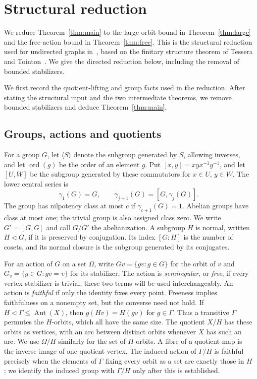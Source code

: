 \documentclass[11pt,a4paper,reqno]{amsart}
\theoremstyle{definition}
\theoremstyle{remark}
\numberwithin{equation}{section}
\DeclareMathOperator{\Aut}{Aut}
\DeclareMathOperator{\ord}{ord}
\newcommand{\gen}[1]{\langle #1\rangle}
\begin{document}
\section{Structural reduction}\label{sec:prelim}
We reduce Theorem~\ref{thm:main} to the large-orbit bound in Theorem~\ref{thm:large} and the free-action bound in Theorem~\ref{thm:free}. This is the structural reduction used for undirected graphs in~\cite[Section 7]{LiMethuku}, based on the finitary structure theorem of Tessera and Tointon~\cite{TT}. We give the directed reduction below, including the removal of bounded stabilizers.

We first record the quotient-lifting and group facts used in the reduction. After stating the structural input and the two intermediate theorems, we remove bounded stabilizers and deduce Theorem~\ref{thm:main}.

\subsection{Groups, actions and quotients}
For a group $G$, let $\gen S$ denote the subgroup generated by $S$, allowing inverses, and let $\ord(g)$ be the order of an element $g$. Put $[x,y]=xyx^{-1}y^{-1}$, and let $[U,W]$ be the subgroup generated by these commutators for $x\in U$, $y\in W$. The lower central series is
\[
 \gamma_1(G)=G,\qquad \gamma_{j+1}(G)=[G,\gamma_j(G)].
\]
The group has nilpotency class at most $c$ if $\gamma_{c+1}(G)=1$. Abelian groups have class at most one; the trivial group is also assigned class zero. We write $G'=[G,G]$ and call $G/G'$ the abelianization. A subgroup $H$ is normal, written $H\lhd G$, if it is preserved by conjugation. Its index $[G:H]$ is the number of cosets, and its normal closure is the subgroup generated by its conjugates.

For an action of $G$ on a set $\Omega$, write $Gv=\{gv:g\in G\}$ for the orbit of $v$ and $G_v=\{g\in G:gv=v\}$ for its stabilizer. The action is \emph{semiregular}, or \emph{free}, if every vertex stabilizer is trivial; these two terms will be used interchangeably. An action is \emph{faithful} if only the identity fixes every point. Freeness implies faithfulness on a nonempty set, but the converse need not hold. If $H\lhd\Gamma\le\Aut(X)$, then $g(Hv)=H(gv)$ for $g\in\Gamma$. Thus a transitive $\Gamma$ permutes the $H$-orbits, which all have the same size. The quotient $X/H$ has these orbits as vertices, with an arc between distinct orbits whenever $X$ has such an arc. We use $\Omega/H$ similarly for the set of $H$-orbits. A fibre of a quotient map is the inverse image of one quotient vertex. The induced action of $\Gamma/H$ is faithful precisely when the elements of $\Gamma$ fixing every orbit as a set are exactly those in $H$; we identify the induced group with $\Gamma/H$ only after this is established.
\end{document}
